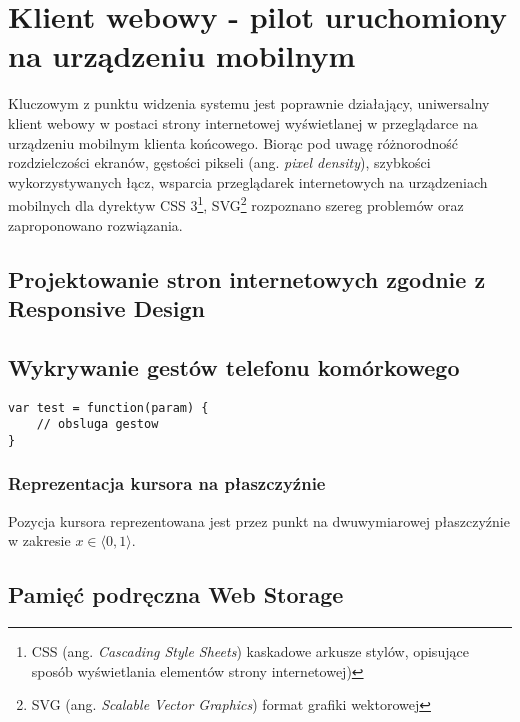 \section{Klient webowy - pilot uruchomiony na urządzeniu mobilnym}

Kluczowym z punktu widzenia systemu jest poprawnie działający, uniwersalny klient webowy w postaci strony internetowej wyświetlanej w przeglądarce na urządzeniu mobilnym klienta końcowego. Biorąc pod uwagę różnorodność rozdzielczości ekranów, gęstości pikseli (ang. \emph{pixel density}), szybkości wykorzystywanych łącz, wsparcia przeglądarek internetowych na urządzeniach mobilnych dla dyrektyw CSS 3\footnote{CSS (ang. \emph{Cascading Style Sheets}) kaskadowe arkusze stylów, opisujące sposób wyświetlania elementów strony internetowej)}, SVG\footnote{SVG (ang. \emph{Scalable Vector Graphics}) format grafiki wektorowej} rozpoznano szereg problemów oraz zaproponowano rozwiązania.

\subsection{Projektowanie stron internetowych zgodnie z Responsive Design}



\subsection{Wykrywanie gestów telefonu komórkowego}

\lstset{language=JavaScript}
\begin{lstlisting}[label=some-code,caption=Some Code]
var test = function(param) {
	// obsluga gestow
}
\end{lstlisting}

\subsubsection{Reprezentacja kursora na płaszczyźnie}

Pozycja kursora reprezentowana jest przez punkt na dwuwymiarowej płaszczyźnie w zakresie \( x\in \langle0, 1\rangle \).

\subsection{Pamięć podręczna Web Storage}
